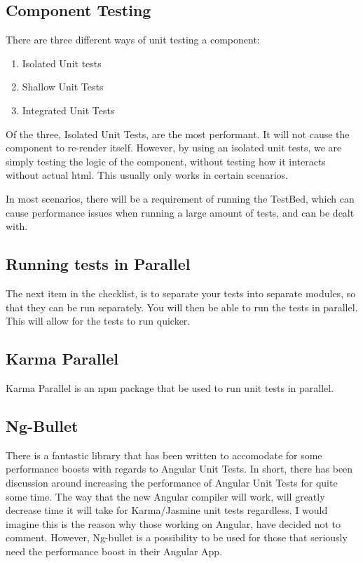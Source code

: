 \subsection{ Component Testing }
There are three different ways of unit testing a component:
\begin{enumerate}
  \item Isolated Unit tests
  \item Shallow Unit Tests
  \item Integrated Unit Tests
\end{enumerate}

Of the three, Isolated Unit Tests, are the most performant. It will not cause
the component to re-render itself. However, by using an isolated unit tests,
we are simply testing the logic of the component, without testing how it
interacts without actual html. This usually only works in certain scenarios.

In most scenarios, there will be a requirement of running the TestBed, which
can cause performance issues when running a large amount of tests, and can be
dealt with.

\subsection{ Running tests in Parallel }
The next item in the checklist, is to separate your tests into separate modules,
so that they can be run separately. You will then be able to run the tests in
parallel. This will allow for the tests to run quicker.

\subsection{ Karma Parallel }
Karma Parallel is an npm package that be used to run unit tests in parallel. 

\subsection{ Ng-Bullet }
There is a fantastic library that has been written to accomodate for some
performance boosts with regards to Angular Unit Tests. In short, there has been
discussion around increasing the performance of Angular Unit Tests for quite
some time. The way that the new Angular compiler will work, will greatly
decrease time it will take for Karma/Jasmine unit tests regardless. I would
imagine this is the reason why those working on Angular, have decided not to
comment. However, Ng-bullet is a possibility to be used for those that seriously
need the performance boost in their Angular App.
